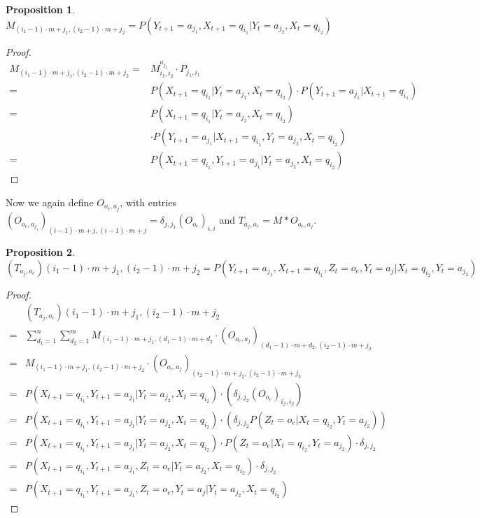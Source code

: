 \documentclass{article}
\newtheorem{prop}{Proposition}
\theoremstyle{definition}
\begin{document}
\begin{prop}
$M_{(i_1-1)\cdot m+j_1,(i_2-1)\cdot m+j_2}=P(Y_{t+1}=a_{j_1},X_{t+1}=q_{i_1}|Y_t=a_{j_2},X_t={q_{i_2}})$ 
\end{prop}
\begin{proof}
\begin{align*}
M_{(i_1-1)\cdot m+j_1,(i_2-1)\cdot m+j_2}=&M^{a_{j_2}}_{i_1,i_2}\cdot P_{j_1,i_1} \\
=&P(X_{t+1}=q_{i_1}|Y_t=a_{j_2},X_t=q_{i_2})\cdot P(Y_{t+1}=a_{j_1}|X_{t+1}=q_{i_1}) \\
=&P(X_{t+1}=q_{i_1}|Y_t=a_{j_2},X_t=q_{i_2})\\
 &  \cdot P(Y_{t+1}=a_{j_1}|X_{t+1}=q_{i_1},Y_t=a_{j_2},X_t=q_{i_2}) \\
=&P(X_{t+1}=q_{i_1},Y_{t+1}=a_{j_1}|Y_t=a_{j_2},X_t=q_{i_2})
\end{align*}
\end{proof}
Now we again define $O_{o_e,a_j}$, with entries $(O_{o_e,a_{j_1}})_{(i-1)\cdot m+j,(i-1)\cdot m+j}=\delta_{j,j_1}(O_{o_e})_{i,i}$ and $T_{a_j,o_e}=M*O_{o_e,a_j}$. 
\begin{prop}
$(T_{a_j,o_e}){(i_1-1)\cdot m+ j_1,(i_2-1)\cdot m+j_2}=P(Y_{t+1}=a_{j_1},X_{t+1}=q_{i_1},Z_t=o_e,Y_t=a_j|X_t=q_{i_2},Y_t=a_{j_2})$
\end{prop}
\begin{proof}
\begin{align*}
&(T_{a_j,o_e}){(i_1-1)\cdot m+ j_1,(i_2-1)\cdot m+j_2}\\
=&\sum\limits_{d_1=1}^{n} \sum\limits_{d_2=1}^m M_{(i_1-1)\cdot m+j_1,(d_1-1)\cdot m+d_2} \cdot (O_{o_e,a_j})_{(d_1-1)\cdot m+d_2,(i_2-1)\cdot m+j_2} \\
=&M_{(i_1-1)\cdot m+j_1,(i_2-1)\cdot m+j_2} \cdot (O_{o_e,a_j})_{(i_2-1)\cdot m+j_2,(i_2-1)\cdot m+j_2} \\
=&P(X_{t+1}=q_{i_1},Y_{t+1}=a_{j_1}|Y_t=a_{j_2},X_t=q_{i_2})\cdot (\delta_{j,j_2} (O_{o_e})_{i_2,i_2}) \\
=&P(X_{t+1}=q_{i_1},Y_{t+1}=a_{j_1}|Y_t=a_{j_2},X_t=q_{i_2})\cdot (\delta_{j,j_2} P(Z_t=o_e|X_{t}=q_{i_2},Y_{t}=a_{j_2})) \\
=&P(X_{t+1}=q_{i_1},Y_{t+1}=a_{j_1}|Y_t=a_{j_2},X_t=q_{i_2})\cdot P(Z_t=o_e|X_{t}=q_{i_2},Y_{t}=a_{j_2}) \cdot \delta_{j,j_2} \\
=&P(X_{t+1}=q_{i_1},Y_{t+1}=a_{j_1},Z_t=o_e|Y_t=a_{j_2},X_t=q_{i_2})\cdot \delta_{j,j_2} \\
=&P(X_{t+1}=q_{i_1},Y_{t+1}=a_{j_1},Z_t=o_e,Y_t=a_j|Y_t=a_{j_2},X_t=q_{i_2})
\end{align*}
\end{proof}
\end{document}
